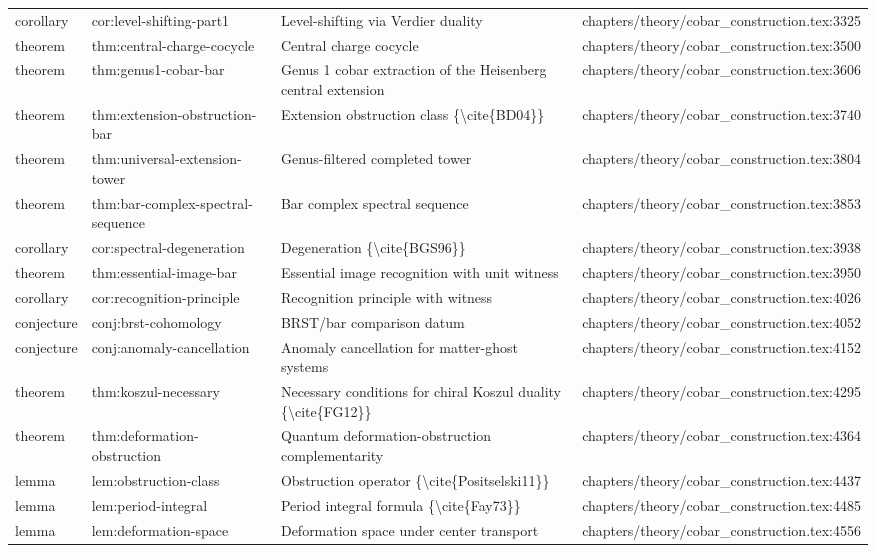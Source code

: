 \documentclass[11pt]{article}
\begin{document}
\begin{longtable}{L{0.10\textwidth}L{0.26\textwidth}L{0.42\textwidth}L{0.22\textwidth}}
corollary & cor:level-shifting-part1 & Level-shifting via Verdier duality & chapters/theory/cobar\_construction.tex:3325\\
theorem & thm:central-charge-cocycle & Central charge cocycle & chapters/theory/cobar\_construction.tex:3500\\
theorem & thm:genus1-cobar-bar & Genus 1 cobar extraction of the Heisenberg central extension & chapters/theory/cobar\_construction.tex:3606\\
theorem & thm:extension-obstruction-bar & Extension obstruction class \{\textbackslash{}cite\{BD04\}\} & chapters/theory/cobar\_construction.tex:3740\\
theorem & thm:universal-extension-tower & Genus-filtered completed tower & chapters/theory/cobar\_construction.tex:3804\\
theorem & thm:bar-complex-spectral-sequence & Bar complex spectral sequence & chapters/theory/cobar\_construction.tex:3853\\
corollary & cor:spectral-degeneration & Degeneration \{\textbackslash{}cite\{BGS96\}\} & chapters/theory/cobar\_construction.tex:3938\\
theorem & thm:essential-image-bar & Essential image recognition with unit witness & chapters/theory/cobar\_construction.tex:3950\\
corollary & cor:recognition-principle & Recognition principle with witness & chapters/theory/cobar\_construction.tex:4026\\
conjecture & conj:brst-cohomology & BRST/bar comparison datum & chapters/theory/cobar\_construction.tex:4052\\
conjecture & conj:anomaly-cancellation & Anomaly cancellation for matter-ghost systems & chapters/theory/cobar\_construction.tex:4152\\
theorem & thm:koszul-necessary & Necessary conditions for chiral Koszul duality \{\textbackslash{}cite\{FG12\}\} & chapters/theory/cobar\_construction.tex:4295\\
theorem & thm:deformation-obstruction & Quantum deformation-obstruction complementarity & chapters/theory/cobar\_construction.tex:4364\\
lemma & lem:obstruction-class & Obstruction operator \{\textbackslash{}cite\{Positselski11\}\} & chapters/theory/cobar\_construction.tex:4437\\
lemma & lem:period-integral & Period integral formula \{\textbackslash{}cite\{Fay73\}\} & chapters/theory/cobar\_construction.tex:4485\\
lemma & lem:deformation-space & Deformation space under center transport & chapters/theory/cobar\_construction.tex:4556\\

\end{longtable}
\end{document}
